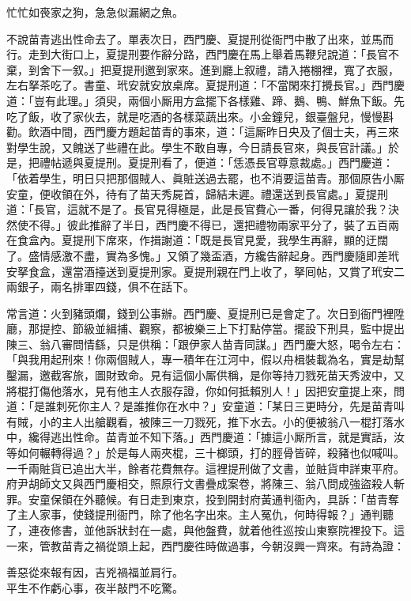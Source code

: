 \begin{myquote}
忙忙如䘮家之狗，急急似漏網之魚。
\end{myquote}

不說苗青逃出性命去了。單表次日，西門慶、夏提刑從衙門中散了出來，並馬而行。走到大街口上，夏提刑要作辭分路，西門慶在馬上舉着馬鞭兒說道：「長官不棄，到舍下一叙。」把夏提刑邀到家來。進到廳上叙禮，請入捲棚裡，寬了衣服，左右拏茶吃了。書童、玳安就安放桌席。夏提刑道：「不當閑來打攪長官。」西門慶道：「豈有此理。」須臾，兩個小厮用方盒擺下各樣雞、蹄、鵝、鴨、鮮魚下飯。先吃了飯，收了家伙去，就是吃酒的各樣菜蔬出來。小金鐘兒，銀臺盤兒，慢慢斟勸。飲酒中間，西門慶方題起苗青的事來，道：「這厮昨日央及了個士夫，再三來對學生說，又餽送了些禮在此。學生不敢自專，今日請長官來，與長官計議。」於是，把禮帖遞與夏提刑。夏提刑看了，便道：「恁憑長官尊意裁處。」西門慶道：「依着學生，明日只把那個賊人、眞賍送過去罷，也不消要這苗青。那個原告小厮安童，便收領在外，待有了苗天秀屍首，歸結未遲。禮還送到長官處。」夏提刑道：「長官，這就不是了。長官見得極是，此是長官費心一番，何得見讓於我？決然使不得。」彼此推辭了半日，西門慶不得已，還把禮物兩家平分了，裝了五百兩在食盒內。夏提刑下席來，作揖謝道：「既是長官見愛，我學生再辭，顯的迂闊了。盛情感激不盡，實為多愧。」又領了幾盃酒，方纔告辭起身。西門慶隨即差玳安拏食盒，還當酒擡送到夏提刑家。夏提刑親在門上收了，拏囘帖，又賞了玳安二兩銀子，兩名排軍四錢，俱不在話下。

常言道：火到豬頭爛，錢到公事辦。西門慶、夏提刑已是會定了。次日到衙門裡陞廳，那提控、節級並緝捕、觀察，都被樂三上下打點停當。擺設下刑具，監中提出陳三、翁八審問情繇，只是供稱：「跟伊家人苗青同謀。」西門慶大怒，喝令左右：「與我用起刑來！你兩個賊人，專一積年在江河中，假以舟楫裝載為名，實是劫幫鑿漏，邀截客旅，圖財致命。見有這個小厮供稱，是你等持刀戮死苗天秀波中，又將棍打傷他落水，見有他主人衣服存證，你如何抵賴別人！」因把安童提上來，問道：「是誰刺死你主人？是誰推你在水中？」安童道：「某日三更時分，先是苗青叫有賊，小的主人出艙觀看，被陳三一刀戮死，推下水去。小的便被翁八一棍打落水中，纔得逃出性命。苗青並不知下落。」西門慶道：「據這小厮所言，就是實話，汝等如何輾轉得過？」於是每人兩夾棍，三十榔頭，打的脛骨皆碎，殺豬也似喊叫。一千兩賍貨已追出大半，餘者花費無存。這裡提刑做了文書，並賍貨申詳東平府。府尹胡師文又與西門慶相交，照原行文書疊成案卷，將陳三、翁八問成強盜殺人斬罪。安童保領在外聽候。有日走到東京，投到開封府黃通判衙內，具訴：「苗青奪了主人家事，使錢提刑衙門，除了他名字出來。主人冤仇，何時得報？」通判聽了，連夜修書，並他訴狀封在一處，與他盤費，就着他徃巡按山東察院裡投下。這一來，管教苗青之禍從頭上起，西門慶徃時做過事，今朝沒興一齊來。有詩為證：

\begin{myquote}
善惡從來報有因，吉兇禍福並肩行。\\平生不作虧心事，夜半敲門不吃驚。
\end{myquote}

